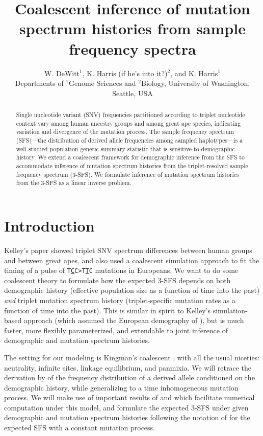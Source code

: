 \documentclass[11pt]{article}
\title{Coalescent inference of mutation spectrum histories from sample frequency spectra}
\author{
W. DeWitt$^{1}$, K. Harris (if he's into it?)$^{2}$, and K. Harris$^{1}$\\
\small{Departments of $^1$Genome Sciences and $^2$Biology, University of Washington, Seattle, USA}
}
\begin{document}
\maketitle

\begin{abstract}

Single nucleotide variant (SNV) frequencies partitioned according to triplet nucleotide context vary among human ancestry groups and among great ape species, indicating variation and divergence of the mutation process.
The sample frequency spectrum (SFS)---the distribution of derived allele frequencies among sampled haplotypes---is a well-studied population genetic summary statistic that is sensitive to demographic history.
We extend a coalescent framework for demographic inference from the SFS to accommodate inference of mutation spectrum histories from the triplet-resolved sample frequency spectrum (3-SFS).
We formulate inference of mutation spectrum histories from the 3-SFS as a linear inverse problem.

\end{abstract}


\section*{Introduction}\label{sec:intro}

Kelley's paper \cite{Harris2017-fw} showed triplet SNV spectrum differences between human groups and between great apes, and also used a coalescent simulation approach to fit the timing of a pulse of \texttt{T\underline{C}C>T\underline{T}C} mutations in Europeans.
We want to do some coalescent theory to formulate how the expected 3-SFS depends on both demographic history (effective population size as a function of time into the past) \emph{and} triplet mutation spectrum history (triplet-specific mutation rates as a function of time into the past).
This is similar in spirit to Kelley's simulation-based approach (which assumed the European demography of \cite{Tennessen2012-dq}), but is much faster, more flexibly parameterized, and extendable to joint inference of demographic and mutation spectrum histories.

The setting for our modeling is Kingman's coalescent \citep{Kingman1982-ge, Kingman1982-tf, Kingman1982-ys, Kingman2000-jr}, with all the usual niceties: neutrality, infinite sites, linkage equilibrium, and panmixia.
We will retrace the derivation by \cite{Griffiths1998-qf} of the frequency distribution of a derived allele conditioned on the demographic history, while generalizing to a time inhomogeneous mutation process.
We will make use of important results of \cite{Polanski2003-kg} and \cite{Polanski2003-ll} which facilitate numerical computation under this model, and formulate the expected 3-SFS under given demographic and mutation spectrum histories following the notation of \cite{Rosen2018-bb} for the expected SFS with a constant mutation process.
\end{document}

